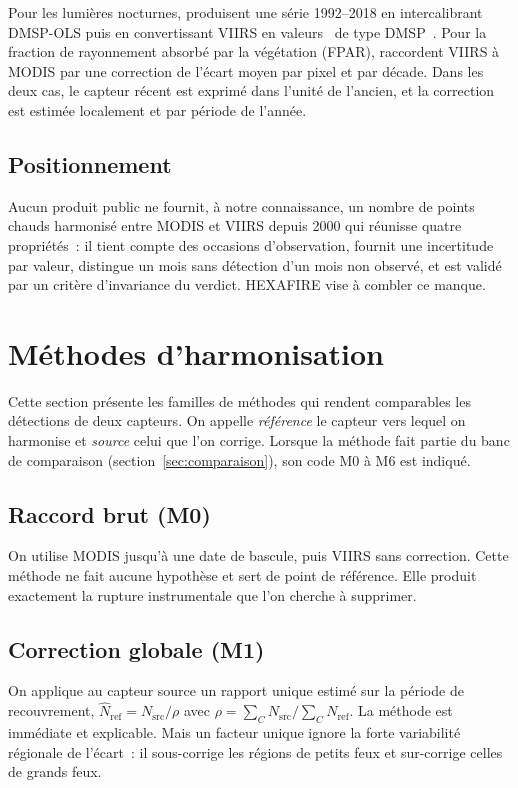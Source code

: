 \documentclass[11pt,a4paper]{article}
\newcommand{\og}{\guillemotleft~}
\newcommand{\fg}{~\guillemotright}
\begin{document}
Pour les lumières nocturnes, \citet{li2020} produisent une série 1992--2018 en intercalibrant DMSP-OLS puis en convertissant VIIRS en valeurs \og de type DMSP\fg. Pour la fraction de rayonnement absorbé par la végétation (FPAR), \citet{seguini2026} raccordent VIIRS à MODIS par une correction de l'écart moyen par pixel et par décade. Dans les deux cas, le capteur récent est exprimé dans l'unité de l'ancien, et la correction est estimée localement et par période de l'année.

\subsection{Positionnement}

Aucun produit public ne fournit, à notre connaissance, un nombre de points chauds harmonisé entre MODIS et VIIRS depuis 2000 qui réunisse quatre propriétés~: il tient compte des occasions d'observation, fournit une incertitude par valeur, distingue un mois sans détection d'un mois non observé, et est validé par un critère d'invariance du verdict. HEXAFIRE vise à combler ce manque.

\section{Méthodes d'harmonisation}\label{sec:methodes}

Cette section présente les familles de méthodes qui rendent comparables les détections de deux capteurs. On appelle \emph{référence} le capteur vers lequel on harmonise et \emph{source} celui que l'on corrige. Lorsque la méthode fait partie du banc de comparaison (section~\ref{sec:comparaison}), son code M0 à M6 est indiqué.

\subsection{Raccord brut (M0)}
On utilise MODIS jusqu'à une date de bascule, puis VIIRS sans correction. Cette méthode ne fait aucune hypothèse et sert de point de référence. Elle produit exactement la rupture instrumentale que l'on cherche à supprimer.

\subsection{Correction globale (M1)}
On applique au capteur source un rapport unique estimé sur la période de recouvrement, $\hat N_{\text{ref}} = N_{\text{src}}/\rho$ avec $\rho = \sum_C N_{\text{src}} / \sum_C N_{\text{ref}}$. La méthode est immédiate et explicable. Mais un facteur unique ignore la forte variabilité régionale de l'écart~: il sous-corrige les régions de petits feux et sur-corrige celles de grands feux.
\end{document}
